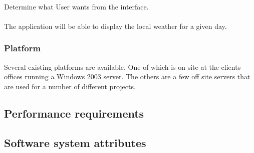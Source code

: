 \documentclass[12pt]{article}
\begin{document}
\paragraph{} Determine what User wants from the interface.
\paragraph{} The application will be able to display the local weather for a given day.

\subsubsection{Platform}\label{sec:Platform}
Several existing platforms are available. One of which is on site at the clients offices running a Windows 2003 server. The others are a few off site servers that are used for a number of different projects.

\subsection{Performance requirements}

\subsection{Software system attributes}
\end{document}
